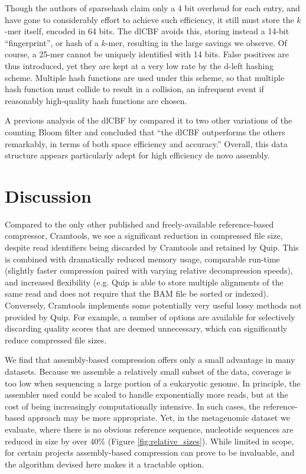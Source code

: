 \documentclass[a4,center,fleqn]{NAR}
\begin{document}
Though the authors of sparsehash claim only a 4 bit overhead for each entry,
and have gone to considerably effort to achieve such efficiency, it still must
store the $k$-mer itself, encoded in 64 bits. The dlCBF avoids this, storing
instead a 14-bit ``fingerprint'', or hash of a $k$-mer, resulting in the large
savings we observe. Of course, a 25-mer cannot be uniquely identified with 14
bits. False positives are thus introduced, yet they are kept at a very low
rate by the d-left hashing scheme. Multiple hash functions are used under this
scheme, so that multiple hash function must collide to result in a
collision, an infrequent event if reasonably high-quality hash functions are
chosen.

A previous analysis of the dlCBF by \citet{Zhang2009} compared it to two other
variations of the counting Bloom filter and concluded that ``the dlCBF
outperforms the others remarkably, in terms of both space efficiency and
accuracy.'' Overall, this data structure appears particularly adept for high
efficiency de novo assembly.

\section{Discussion}

Compared to the only other published and freely-available reference-based
compressor, Cramtools, we see a significant reduction in compressed file size,
despite read identifiers being discarded by Cramtools and retained by Quip.
This is combined with dramatically reduced memory usage, comparable run-time
(slightly faster compression paired with varying relative decompression
speeds), and increased flexibility (e.g. Quip is able to store multiple
alignments of the same read and does not require that the BAM file be sorted
or indexed). Conversely, Cramtools implements some potentially very useful
lossy methods not provided by Quip. For example, a number of options are
available for selectively discarding quality scores that are deemed
unnecessary, which can significantly reduce compressed file sizes.

We find that assembly-based compression offers only a small advantage in many
datasets. Because we assemble a relatively small subset of the data, coverage
is too low when sequencing a large portion of a eukaryotic genome. In
principle, the assembler used could be scaled to handle exponentially more
reads, but at the cost of being increasingly computationally intensive. In
such cases, the reference-based approach may be more appropriate. Yet, in the
metagenomic dataset we evaluate, where there is no obvious reference sequence,
nucleotide sequences are reduced in size by over 40\% (Figure
\ref{fig:relative_sizes}). While limited in scope, for certain projects
assembly-based compression can prove to be invaluable, and the algorithm devised
here makes it a tractable option.
\end{document}
